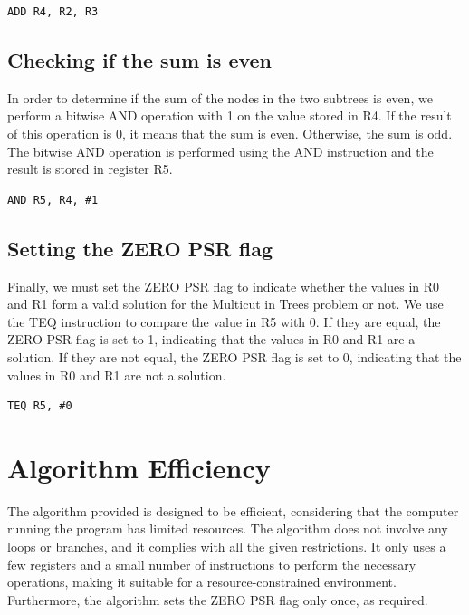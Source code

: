 \begin{verbatim}
ADD R4, R2, R3
\end{verbatim}

\subsection{Checking if the sum is even}

In order to determine if the sum of the nodes in the two subtrees is even, we perform a bitwise AND operation with 1 on the value stored in R4. If the result of this operation is 0, it means that the sum is even. Otherwise, the sum is odd. The bitwise AND operation is performed using the AND instruction and the result is stored in register R5.

\begin{verbatim}
AND R5, R4, #1
\end{verbatim}

\subsection{Setting the ZERO PSR flag}

Finally, we must set the ZERO PSR flag to indicate whether the values in R0 and R1 form a valid solution for the Multicut in Trees problem or not. We use the TEQ instruction to compare the value in R5 with 0. If they are equal, the ZERO PSR flag is set to 1, indicating that the values in R0 and R1 are a solution. If they are not equal, the ZERO PSR flag is set to 0, indicating that the values in R0 and R1 are not a solution.

\begin{verbatim}
TEQ R5, #0
\end{verbatim}

\section{Algorithm Efficiency}

The algorithm provided is designed to be efficient, considering that the computer running the program has limited resources. The algorithm does not involve any loops or branches, and it complies with all the given restrictions. It only uses a few registers and a small number of instructions to perform the necessary operations, making it suitable for a resource-constrained environment. Furthermore, the algorithm sets the ZERO PSR flag only once, as required.



